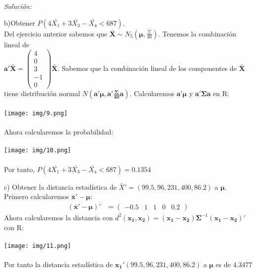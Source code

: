 \documentclass[12pt]{article}
\newenvironment{sol}
    {\emph{Solución:}
    }
    {
    }
\begin{document}
\begin{sol}
b)Obtener $P(4\bar{X_1}+3\bar{X_3}-\bar{X_4}<687)$.\\
Del ejercicio anterior sabemos que $\mathbf{\bar{X}} \sim N_5(\mathbf{\mu},\frac{\Sigma}{40})$. Tenemos la combinación lineal de\\ $\mathbf{a'\bar{X}}= \begin{pmatrix}
4\\0\\3\\-1\\0
\end{pmatrix}\mathbf{\bar{X}}$. Sabemos que la combinación lineal de los componentes de  $\mathbf{\bar{X}}$ tiene distribución normal $N(\mathbf{a' \mu, a' \frac{\Sigma}{40} a})$.
Calcularemos $\mathbf{a' \mu}$ y $\mathbf{a' \Sigma a}$ en R: \\\\
\texttt{[image: img/9.png]}\\\\
Ahora calcularemos la probabilidad:\\\\
\texttt{[image: img/10.png]}\\\\
Por tanto,  $P(4\bar{X_1}+3\bar{X_3}-\bar{X_4}<687)=0.1354$

\pagebreak

c) Obtener la distancia estadística de $\bar{X}'=(99.5,96,231,400,86.2)$ a $\mathbf{\mu}$. \\
Primero calcularemos $\mathbf{\bar{x}'}-\mathbf{\mu}$:
\begin{align*}
(\mathbf{\bar{x}'}-\mathbf{\mu})' &= \begin{pmatrix}
-0.5 & 1 & 1 & 0 & 0.2
\end{pmatrix}
\end{align*}
Ahora calcularemos la distancia con $d^2(\mathbf{x_1,x_2})=(\mathbf{x_1-x_2})\mathbf{\Sigma}^{-1}(\mathbf{x_1-x_2})'$ con R:\\\\
\texttt{[image: img/11.png]}\\\\
Por tanto la distancia estadística de $\mathbf{x_1}'(99.5,96,231,400,86.2)$ a $\mathbf{\mu}$ es de $4.3477$ 

\pagebreak


\end{sol}
\end{document}

